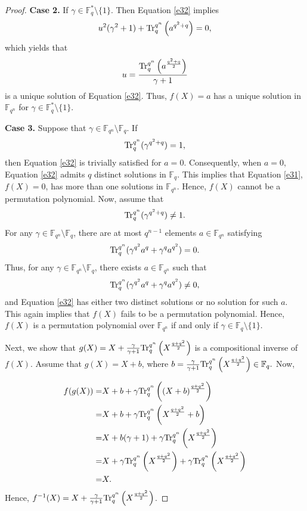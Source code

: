 \documentclass[11pt]{amsart}
\theoremstyle{plain}
\numberwithin{equation}{section}
\theoremstyle{definition}
\newcommand{\F}{\mathbb F}
\def\Tr{{\rm Tr}}
\begin{document}
\begin{proof}
  \textbf{Case 2.} If $\gamma \in \F_{q}^* \setminus\{1\}$. Then Equation \eqref{e32} implies
  \begin{equation*}
      u^2(\gamma^2+1)+\Tr_{q}^{q^n}\left(a^{q^2+q}\right)=0,
  \end{equation*}
  which yields that 
  $$u=\frac{\Tr_{q}^{q^n}\left(a^{\frac{q^2+q}{2}}\right)}{\gamma+1}$$  
  is a unique solution of Equation \eqref{e32}. Thus, $f(X)=a$ has a unique solution in $\F_{q^n}$ for $\gamma \in \F_{q}^* \setminus\{1\}.$

  \textbf{Case 3.} Suppose that $\gamma \in \F_{q^n} \setminus \F_q$. If $$\Tr_{q}^{q^n}(\gamma^{q^2+q})=1,$$ then Equation \eqref{e32} is trivially satisfied for $a=0$. Consequently, when $a=0$, Equation \eqref{e32} admits $q$ distinct solutions in $\F_q$. This implies that Equation \eqref{e31}, $f(X)=0$, has more than one solutions in $\F_{q^n}$. Hence, $f(X)$ cannot be a permutation polynomial. Now, assume that $$\Tr_{q}^{q^n}(\gamma^{q^2+q})\neq1.$$ For any $\gamma \in \F_{q^n} \setminus \F_q$, there are at most $q^{n-1}$ elements $a \in \F_{q^n}$ satisfying $$\Tr_{q}^{q^n}(\gamma^{q^2}a^{q}+\gamma^qa^{q^2})=0.$$ 
  Thus, for any $\gamma \in \F_{q^n} \setminus \F_q$, there exists $a \in \F_{q^n}$ such that $$\Tr_{q}^{q^n}(\gamma^{q^2}a^{q}+\gamma^qa^{q^2})\neq 0,$$
  and  Equation \eqref{e32} has either two distinct solutions or no solution for such $a$. This again implies that $f(X)$ fails to be a permutation polynomial. Hence, $f(X)$ is a permutation polynomial over $\F_{q^n}$ if and only if $\gamma \in \F_{q} \setminus\{1\}$.

  Next, we show that $g(X)=X+\frac{\gamma}{\gamma+1}\Tr_{q}^{q^n}\left(X^{\frac{q+q^2}{2}}\right)$ is a compositional inverse of $f(X)$. Assume that $g(X)=X+b$, where $b=\frac{\gamma}{\gamma+1}\Tr_{q}^{q^n}\left(X^{\frac{q+q^2}{2}}\right) \in \F_q.$ Now, 

\begin{equation*}
    \begin{split}
        f(g(X))=&X+b+\gamma \Tr_{q}^{q^n}\left((X+b)^{\frac{q+q^2}{2}}\right)
        \\=&X+b+\gamma \Tr_{q}^{q^n}\left(X^{\frac{q+q^2}{2}}+b\right)
        \\=&X+b(\gamma+1)+\gamma \Tr_{q}^{q^n}\left(X^{\frac{q+q^2}{2}}\right)
        \\=&X+\gamma \Tr_{q}^{q^n}\left(X^{\frac{q+q^2}{2}}\right)+\gamma \Tr_{q}^{q^n}\left(X^{\frac{q+q^2}{2}}\right)
        \\=&X.
    \end{split}
\end{equation*}
Hence, $f^{-1}(X)=X+\frac{\gamma}{\gamma+1}\Tr_{q}^{q^n}\left(X^{\frac{q+q^2}{2}}\right)$.
\end{proof}
\end{document}

